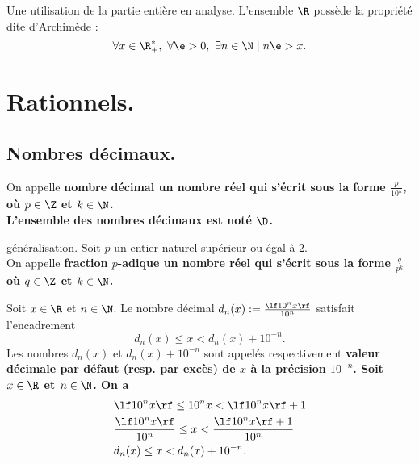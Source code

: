\documentclass[11pt]{article}
\begin{document}
\begin{lemme}{Une utilisation de la partie entière en analyse.}{}
    L'ensemble $\R$ possède la propriété dite d'Archimède :
    \begin{equation*}
        \forall x \in \R_+^*,~\forall \e>0,~\exists n\in\N \mid n\e>x.
    \end{equation*}
\end{lemme}

\section{Rationnels.}

\subsection{Nombres décimaux.}

\begin{defi}{}{}
    On appelle \bf{nombre décimal} un nombre réel qui s'écrit sous la forme $\frac{p}{10^k}$, où $p\in\Z$ et $k\in\N$.\\
    L'ensemble des nombres décimaux est noté $\D$.
\end{defi}

\begin{defi}{généralisation.}{}
    Soit $p$ un entier naturel supérieur ou égal à 2.\\
    On appelle \bf{fraction $p$-adique} un nombre réel qui s'écrit sous la forme $\frac{q}{p^k}$ où $q\in\Z$ et $k\in\N$.
\end{defi}

\begin{prop}{}{}
    Soit $x\in\R$ et $n\in\N$. Le nombre décimal $d_n(x):=\frac{\lf 10^nx\rf}{10^n}$ satisfait l'encadrement
    \begin{equation*}
        d_n(x) \leq x<d_n(x)+10^{-n}.
    \end{equation*}
    Les nombres $d_n(x)$ et $d_n(x)+10^{-n}$ sont appelés respectivement \bf{valeur décimale} par défaut (resp. par excès) de $x$ à la précision $10^{-n}$.
    \tcblower
    Soit $x\in\R$ et $n\in\N$. On a
    \begin{align*}
        &\lf 10^nx \rf \leq 10^nx<\lf 10^nx\rf + 1\\
        &\frac{\lf 10^n x \rf}{10^n} \leq x < \frac{\lf 10^n x\rf + 1}{10^n}\\
        &d_n(x)\leq x < d_n(x)+10^{-n}.
    \end{align*}
\end{prop}
\end{document}
